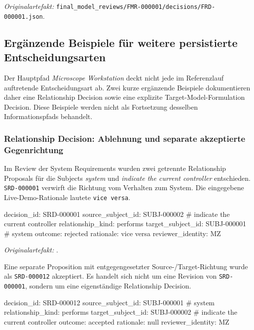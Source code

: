 \noindent\textit{Originalartefakt:}
\texttt{final\_model\_reviews/FMR-000001/decisions/FRD-000001.json}.

\subsection{Ergänzende Beispiele für weitere persistierte Entscheidungsarten}
\label{app:traceability_930444_additional}

Der Hauptpfad \emph{Microscope Workstation} deckt nicht jede im Referenzlauf
auftretende Entscheidungsart ab. Zwei kurze ergänzende Beispiele dokumentieren
daher eine Relationship Decision sowie eine explizite Target-Model-Formulation
Decision. Diese Beispiele werden nicht als Fortsetzung desselben
Informationspfads behandelt.

\subsubsection{Relationship Decision: Ablehnung und separate akzeptierte Gegenrichtung}

Im Review der System Requirements wurden zwei getrennte Relationship Proposals
für die Subjects \emph{system} und \emph{indicate the current controller}
entschieden. \texttt{SRD-000001} verwirft die Richtung vom Verhalten zum
System. Die eingegebene Live-Demo-Rationale lautete \texttt{vice versa}.

\begin{evidencebox}
decision_id:       SRD-000001
source_subject_id: SUBJ-000002   # indicate the current controller
relationship_kind: performs
target_subject_id: SUBJ-000001   # system
outcome:           rejected
rationale:         vice versa
reviewer_identity: MZ
\end{evidencebox}

\noindent\textit{Originalartefakt:}
.

Eine separate Proposition mit entgegengesetzter Source-/Target-Richtung wurde
als \texttt{SRD-000012} akzeptiert. Es handelt sich nicht um eine Revision von
\texttt{SRD-000001}, sondern um eine eigenständige Relationship Decision.

\begin{evidencebox}
decision_id:       SRD-000012
source_subject_id: SUBJ-000001   # system
relationship_kind: performs
target_subject_id: SUBJ-000002   # indicate the current controller
outcome:           accepted
rationale:         null
reviewer_identity: MZ
\end{evidencebox}

